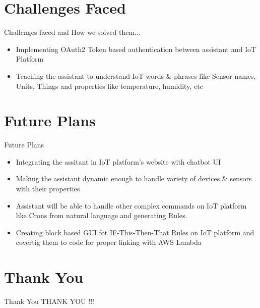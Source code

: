 \documentclass[10pt, a4paper]{beamer}
\begin{document}
\section{Challenges Faced}
\begin{frame}{Challenges faced and How we solved them...}
	\begin{itemize}
		\item Implementing OAuth2 Token based authentication between assistant and IoT Platform
		\newline\\
		\item Teaching the assistant to understand IoT words \& phrases like Sensor names, Units, Things and properties like temperature, humidity, etc
	\end{itemize}
\end{frame}

\section{Future Plans}
\begin{frame}{Future Plans}
	\begin{itemize}
		\item Integrating the assitant in IoT platform's website with chatbot UI
		\newline\\
		\item Making the assistant dynamic enough to handle variety of devices \& sensors with their properties
		\newline\\
		\item Assistant will be able to handle other complex commands on IoT platform like Crons from natural language and generating Rules.
		\newline\\
		\item Creating block based GUI fot IF-This-Then-That Rules on IoT platform and covertig them to code for proper linking with AWS Lambda
	\end{itemize}
\end{frame}


\section{Thank You}
\begin{frame}{Thank You}
	\centering THANK YOU !!!
\end{frame}
\end{document}
